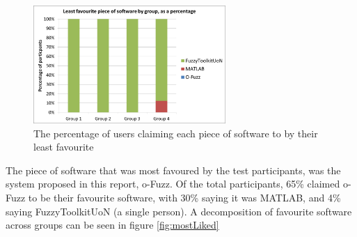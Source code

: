 \begin{figure}[ht!]
	\begin{center}
		\includegraphics[width=0.65\textwidth]{images/leastFav}
	\end{center}
	\vspace{-5mm}
	\captionsetup{justification=centering,margin=2cm}	
	\caption{The percentage of users claiming each piece of software to by their least favourite}
	\label{fig:leastFavour}
	\vspace{-2mm}
\end{figure}
\noindent 
The piece of software that was most favoured by the test participants, was the system proposed in this report, o-Fuzz. Of the total participants, 65\% claimed o-Fuzz to be their favourite software, with 30\% saying it was MATLAB, and 4\% saying FuzzyToolkitUoN (a single person). A decomposition of favourite software across groups can be seen in figure \ref{fig:mostLiked}
			
